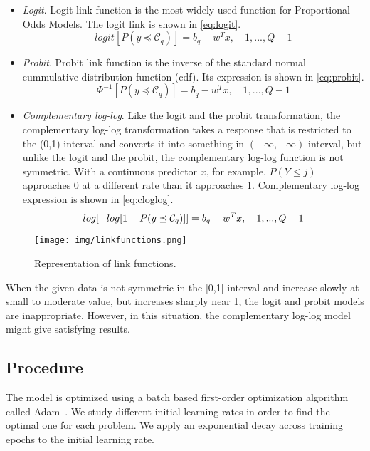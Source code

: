 \documentclass[journal]{IEEEtran}
\begin{document}
	\begin{itemize}
		\item \textit{Logit}. Logit link function is the most widely used function for Proportional Odds Models. The logit link is shown in \ref{eq:logit}.
		\begin{equation}
		logit[P(y \preceq \mathcal{C}_q)] = b_q - w^Tx, \quad 1, ..., Q-1
		\label{eq:logit}
		\end{equation}
		\item \textit{Probit}. Probit link function is the inverse of the standard normal cummulative distribution function (cdf). Its expression is shown in \ref{eq:probit}.	
		\begin{equation}
		\Phi^{-1}[P(y \preceq \mathcal{C}_q)] = b_q - w^Tx, \quad 1, ..., Q-1
		\label{eq:probit}
		\end{equation}
		\item \textit{Complementary log-log}. Like the logit and the probit transformation, the complementary log-log transformation takes a response that is restricted to the (0,1) interval and converts it into something in $(-\infty, +\infty)$ interval, but unlike the logit and the probit, the complementary log-log function is not symmetric. With a continuous predictor $x$, for example, $P(Y \le j)$ approaches 0 at a different rate than it approaches 1. Complementary log-log expression is shown in  \ref{eq:cloglog}.
		\begin{equation}
		\small
		log[-log[1 - P(y \preceq \mathcal{C}_q)]] = b_q - w^Tx, \quad 1, ..., Q-1
		\label{eq:cloglog}
		\end{equation}
	\end{itemize}
	
	\begin{figure}[!t]
		\centering
		\texttt{[image: img/linkfunctions.png]}
		\caption{Representation of link functions.}
		\label{fig:linkfunctions}
	\end{figure}
	
	When the given data is not symmetric in the [0,1] interval and increase slowly at small to moderate value, but increases sharply near 1, the logit and probit models are inappropriate. However, in this situation, the complementary log-log model might give satisfying results.
	
	\subsection{Procedure}
	The model is optimized using a batch based first-order optimization algorithm called Adam~\cite{kingma2014adam}. We study different initial learning rates in order to find the optimal one for each problem. We apply an exponential decay across training epochs to the initial learning rate.
	
\end{document}
